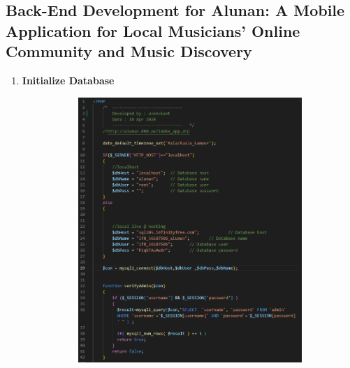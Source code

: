 \clearpage

\subsection{Back-End Development for Alunan: A Mobile Application for Local Musicians’ Online Community and Music Discovery}
\begin{enumerate}[1.]
    \item \textbf{Initialize Database}
    \begin{figure}[h]\ContinuedFloat
        \centering
        \begin{subfigure}[b]{0.6\textwidth}
            \centering
            \includegraphics[width=\textwidth]{mainmatter/images/backend/alunandb1.png}
            \label{fig:sub1}
        \end{subfigure}
        \hspace{0.04\textwidth}
        \begin{subfigure}[b]{0.6\textwidth}
            \centering

\end{subfigure}
\end{figure}
\end{enumerate}
